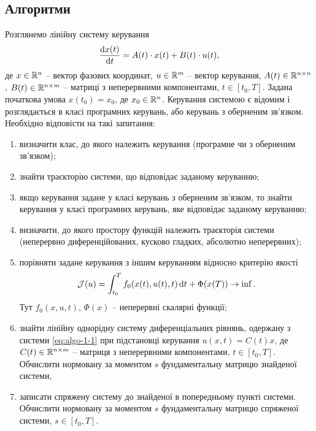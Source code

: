 \subsection{Алгоритми}

\begin{problem*}
	Розглянемо лінійну систему керування 
	\begin{equation} 
	    \label{eq:algo-1-1}
	    \frac{\mathop{}\!\mathrm{d} x(t)}{\mathop{}\!\mathrm{d} t} = A (t) \cdot x(t) + B(t) \cdot u(t),
	\end{equation} 
	де $x \in \mathbb{R}^n$ -- вектор фазових координат, $u \in \mathbb{R}^m$ -- вектор керування, $A(t) \in \mathbb{R}^{n\times n}$, $B(t) \in \mathbb{R}^{n \times m}$ -- матриці з неперервними компонентами, $t \in [t_0, T]$. Задана початкова умова $x(t_0) = x_0$, де $x_0 \in \mathbb{R}^n$.  Керування системою є відомим і розглядається в класі програмних керувань, або керувань з оберненим зв'язком. Необхідно відповісти на такі запитання:
	\begin{enumerate}
		\item визначити клас, до якого належить керування (програмне чи з оберненим зв'язком);
		\item знайти траєкторію системи, що відповідає заданому керуванню;
		\item якщо керування задане у класі керувань з оберненим зв'язком, то знайти керування у класі програмних керувань, яке відповідає заданому керуванню;
		\item визначити, до якого простору функцій належить траєкторія системи (неперервно диференційованих, кусково гладких, абсолютно неперервних);
		\item порівняти задане керування з іншим керуванням відносно критерію якості 
		\begin{equation}
		    \label{eq:algo-1-2}
		    \mathcal{J}(u) = \int_{t_0}^T f_0(x(t), u(t), t) \mathop{}\!\mathrm{d} t + \Phi(x(T)) \to \inf.   
		\end{equation}
	Тут $f_0(x,u,t)$, $\Phi (x)$ -- неперервні скалярні функції;
	   \item знайти лінійну однорідну систему диференціальних рівнянь, одержану з системи \eqref{eq:algo-1-1} при підстановці керування $u(x,t) = C(t)x$, де $C(t) \in \mathbb{R}^{n\times m}$ -- матриця з неперервними компонентами, $t \in [t_0, T]$. Обчислити нормовану за моментом $s$ фундаментальну матрицю знайденої системи, 
	   \item записати спряжену систему до знайденої в попередньому пункті системи. Обчислити  нормовану за моментом $s$ фундаментальну матрицю спряженої системи,  $s \in [t_0, T]$.
	
	\end{enumerate}
\end{problem*}


